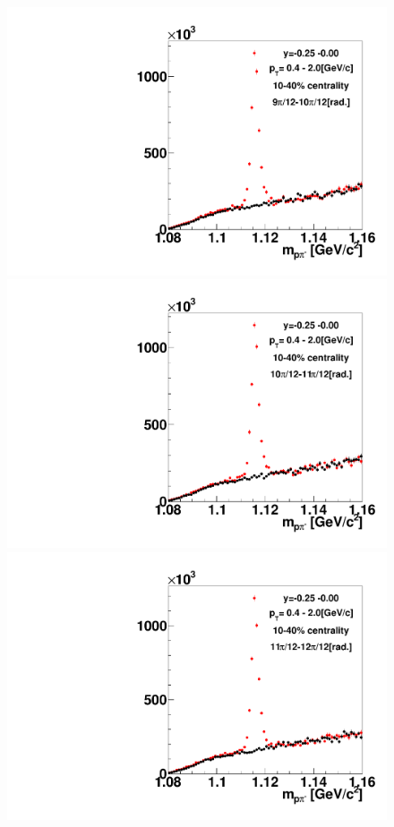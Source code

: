 \begin{figure}[h]
\includegraphics[width=0.14\linewidth]{chapterX/fig/ld_v2_sig/kf_ptslice0_cent1_ld_flow_phi10_rap2_check.pdf}
\includegraphics[width=0.14\linewidth]{chapterX/fig/ld_v2_sig/kf_ptslice0_cent1_ld_flow_phi11_rap2_check.pdf}
\includegraphics[width=0.14\linewidth]{chapterX/fig/ld_v2_sig/kf_ptslice0_cent1_ld_flow_phi12_rap2_check.pdf}


\end{figure}
